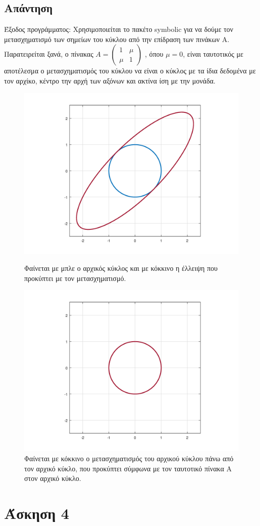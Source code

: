 \documentclass[a4paper,12pt]{article}
\begin{document}
\subsection{Απάντηση}
Έξοδος προγράμματος:
%
Χρησιμοποιείται το πακέτο symbolic για να δούμε τον μετασχηματισμό των σημείων του κύκλου από
την επίδραση των πινάκων Α.
Παρατειρείται ξανά, ο πίνακας
$
	A = \begin{pmatrix}
		1   & \mu \\
		\mu & 1
	\end{pmatrix}
$
, όπου $\mu = 0$, είναι ταυτοτικός με αποτέλεσμα ο μετασχηματισμός του κύκλου να είναι ο κύκλος
με τα ίδια δεδομένα με τον αρχίκο, κέντρο την αρχή των αξόνων και ακτίνα ίση με την μονάδα.
\begin{figure}
	\centering
	\includegraphics[scale=0.6]{a.png}
	\caption{Φαίνεται με μπλε ο αρχικός κύκλος και με κόκκινο η έλλειψη που προκύπτει με τον
		μετασχηματισμό.}
	\includegraphics[scale=0.6]{i.png}
	\caption{Φαίνεται με κόκκινο ο μετασχηματισμός του αρχικού κύκλου πάνω από τον αρχικό κύκλο,
		που προκύπτει σύμφωνα με τον ταυτοτικό πίνακα Α στον αρχικό κύκλο.}
\end{figure}
\newpage\section{Άσκηση 4}
\end{document}
